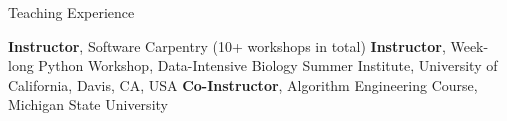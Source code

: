 \begin{rubric}{Teaching Experience}

\entry*[2015 -- Present] \textbf{Instructor}, Software Carpentry (10+ workshops in total)
%
\entry*[Summer 2017] \textbf{Instructor}, Week-long Python Workshop, Data-Intensive Biology Summer Institute, University of California, Davis, CA, USA
%
\entry*[Spring 2016] \textbf{Co-Instructor}, Algorithm Engineering Course, Michigan State University 
%
\ifshort
\else

%
%
\fi
\end{rubric}